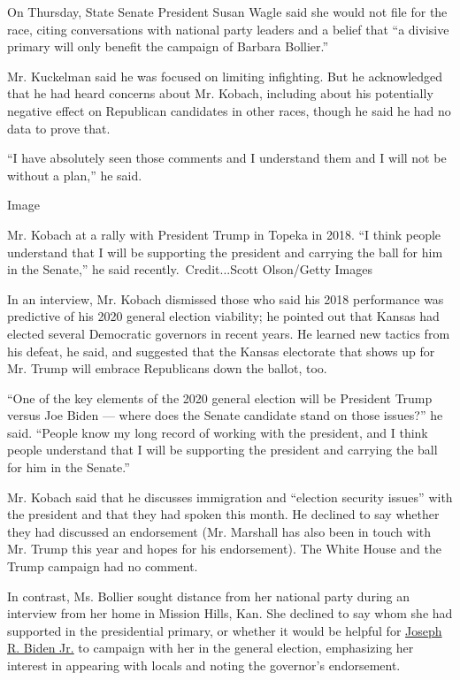 On Thursday, State Senate President Susan Wagle said she would not file
for the race, citing conversations with national party leaders and a
belief that ``a divisive primary will only benefit the campaign of
Barbara Bollier.''

Mr. Kuckelman said he was focused on limiting infighting. But he
acknowledged that he had heard concerns about Mr. Kobach, including
about his potentially negative effect on Republican candidates in other
races, though he said he had no data to prove that.

``I have absolutely seen those comments and I understand them and I will
not be without a plan,'' he said.

Image

Mr. Kobach at a rally with President Trump in Topeka in 2018. ``I think
people understand that I will be supporting the president and carrying
the ball for him in the Senate,'' he said recently.~Credit...Scott
Olson/Getty Images

In an interview, Mr. Kobach dismissed those who said his 2018
performance was predictive of his 2020 general election viability; he
pointed out that Kansas had elected several Democratic governors in
recent years. He learned new tactics from his defeat, he said, and
suggested that the Kansas electorate that shows up for Mr. Trump will
embrace Republicans down the ballot, too.

``One of the key elements of the 2020 general election will be President
Trump versus Joe Biden --- where does the Senate candidate stand on
those issues?'' he said. ``People know my long record of working with
the president, and I think people understand that I will be supporting
the president and carrying the ball for him in the Senate.''

Mr. Kobach said that he discusses immigration and ``election security
issues'' with the president and that they had spoken this month. He
declined to say whether they had discussed an endorsement (Mr. Marshall
has also been in touch with Mr. Trump this year and hopes for his
endorsement). The White House and the Trump campaign had no comment.

In contrast, Ms. Bollier sought distance from her national party during
an interview from her home in Mission Hills, Kan. She declined to say
whom she had supported in the presidential primary, or whether it would
be helpful for
\href{https://www.nytimes.com/interactive/2020/us/elections/joe-biden.html}{Joseph
R. Biden Jr.} to campaign with her in the general election, emphasizing
her interest in appearing with locals and noting the governor's
endorsement.

